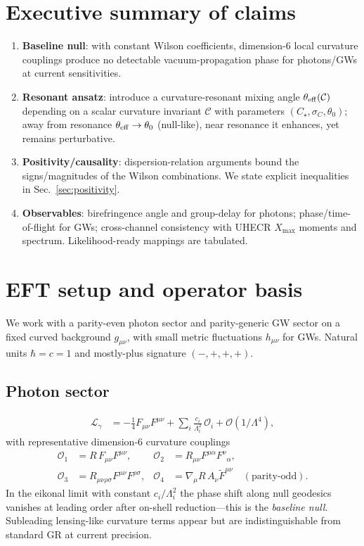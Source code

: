 \documentclass[%
 reprint,
 amsmath,amssymb,
 aps,
 pra,
 longbibliography,
 nofootinbib
]{revtex4-2}
\newcommand{\Lag}{\mathcal{L}}
\newcommand{\Ord}[1]{\mathcal{O}\!\left(#1\right)}
\begin{document}
\section{Executive summary of claims}
\label{sec:summary}
\begin{enumerate}[leftmargin=*,nosep]
\item \textbf{Baseline null}: with constant Wilson coefficients, dimension-6 local curvature couplings produce no detectable vacuum-propagation phase for photons/GWs at current sensitivities.
\item \textbf{Resonant ansatz}: introduce a curvature-resonant mixing angle $\theta_{\rm eff}(\mathcal{C})$ depending on a scalar curvature invariant $\mathcal{C}$ with parameters $(C_\star,\sigma_C,\theta_0)$; away from resonance $\theta_{\rm eff}\to\theta_0$ (null-like), near resonance it enhances, yet remains perturbative.
\item \textbf{Positivity/causality}: dispersion-relation arguments bound the signs/magnitudes of the Wilson combinations. We state explicit inequalities in Sec.~\ref{sec:positivity}.
\item \textbf{Observables}: birefringence angle and group-delay for photons; phase/time-of-flight for GWs; cross-channel consistency with UHECR $X_{\max}$ moments and spectrum. Likelihood-ready mappings are tabulated.
\end{enumerate}

\section{EFT setup and operator basis}
\label{sec:eft}
We work with a parity-even photon sector and parity-generic GW sector on a fixed curved background $g_{\mu\nu}$, with small metric fluctuations $h_{\mu\nu}$ for GWs. Natural units $\hbar=c=1$ and mostly-plus signature $(-,+,+,+)$.

\subsection{Photon sector}
\label{sec:photon-sector}
\begin{align}
\Lag_\gamma &=
-\frac{1}{4} F_{\mu\nu}F^{\mu\nu}
+\sum_i \frac{c_i}{\Lambda_i^2}\,\mathcal{O}_i
+\Ord{1/\Lambda^4},
\end{align}
with representative dimension-6 curvature couplings
\begin{align}
\mathcal{O}_1 &= R\,F_{\mu\nu}F^{\mu\nu},&
\mathcal{O}_2 &= R_{\mu\nu}F^{\mu\alpha}F^{\nu}{}_{\alpha},\\
\mathcal{O}_3 &= R_{\mu\nu\rho\sigma}F^{\mu\nu}F^{\rho\sigma},&
\mathcal{O}_4 &= \nabla_\mu R\, A_\nu \tilde F^{\mu\nu}\quad(\text{parity-odd}).
\end{align}
In the eikonal limit with constant $c_i/\Lambda_i^2$ the phase shift along null geodesics vanishes at leading order after on-shell reduction—this is the \emph{baseline null}. Subleading lensing-like curvature terms appear but are indistinguishable from standard GR at current precision.
\end{document}
